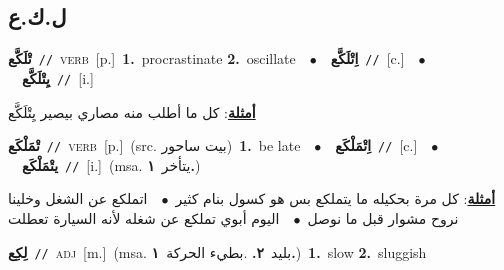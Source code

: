 \documentclass[10pt,a4paper,twoside]{article} %
\begin{document}
\begin{multicols}{2}
\vspace{-3mm}
\subsection*{\color{blue}\foreignlanguage{arabic}{ل.ك.ع}\color{blue}{}} 

{\setlength\topsep{0pt}\textbf{\foreignlanguage{arabic}{تْلَكَّع}}\ {\color{gray}\texttt{//}\color{black}}\ \textsc{verb}\ [p.]\ \textbf{1.}~procrastinate  \textbf{2.}~oscillate\ \ $\bullet$\ \ \setlength\topsep{0pt}\textbf{\foreignlanguage{arabic}{اِتْلَكَّع}}\ {\color{gray}\texttt{//}\color{black}}\ [c.]\ \ $\bullet$\ \ \setlength\topsep{0pt}\textbf{\foreignlanguage{arabic}{يِتْلَكَّع}}\ {\color{gray}\texttt{//}\color{black}}\ [i.]\  \begin{flushright}\color{gray}\foreignlanguage{arabic}{\textbf{\underline{\foreignlanguage{arabic}{أمثلة}}}: كل ما أطلب منه مصاري بيصير يِتْلَكَّع}\end{flushright}\color{black}} \vspace{2mm}

{\setlength\topsep{0pt}\textbf{\foreignlanguage{arabic}{تْمَلْكَع}}\ {\color{gray}\texttt{//}\color{black}}\ \textsc{verb}\ [p.]\ (src. \color{gray}\foreignlanguage{arabic}{بيت ساحور}\color{black})\ \textbf{1.}~be late\ \ $\bullet$\ \ \setlength\topsep{0pt}\textbf{\foreignlanguage{arabic}{اِتْمَلْكَع}}\ {\color{gray}\texttt{//}\color{black}}\ [c.]\ \ $\bullet$\ \ \setlength\topsep{0pt}\textbf{\foreignlanguage{arabic}{يتْمَلْكَع}}\ {\color{gray}\texttt{//}\color{black}}\ [i.]\ \color{gray}(msa. \foreignlanguage{arabic}{يتأخر}~\foreignlanguage{arabic}{\textbf{١.}})\color{black}\  \begin{flushright}\color{gray}\foreignlanguage{arabic}{\textbf{\underline{\foreignlanguage{arabic}{أمثلة}}}: كل مرة بحكيله ما يتملكع بس هو كسول بنام كثير\ $\bullet$\ \  اتملكع عن الشغل وخلينا نروح مشوار قبل ما نوصل\ $\bullet$\ \  اليوم أبوي تملكع عن شغله لأنه السيارة تعطلت}\end{flushright}\color{black}} \vspace{2mm}

{\setlength\topsep{0pt}\textbf{\foreignlanguage{arabic}{لِكِع}}\ {\color{gray}\texttt{//}\color{black}}\ \textsc{adj}\ [m.]\ \color{gray}(msa. \foreignlanguage{arabic}{بليد}~\foreignlanguage{arabic}{\textbf{٢.}}  .\foreignlanguage{arabic}{بطيء الحركة}~\foreignlanguage{arabic}{\textbf{١.}})\color{black}\ \textbf{1.}~slow  \textbf{2.}~sluggish\ } \vspace{2mm}


\end{multicols}
\end{document}
